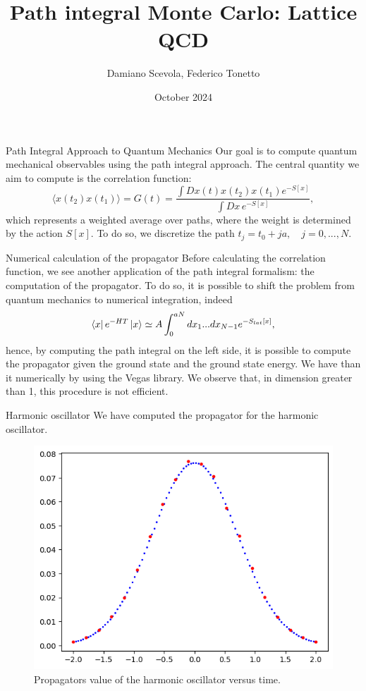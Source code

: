\documentclass{beamer}
\title{Path integral Monte Carlo: Lattice QCD}
\author{Damiano Scevola, Federico Tonetto}
\date{October 2024}
\begin{document}
\frame{\titlepage}

\begin{frame}{Path Integral Approach to Quantum Mechanics}
    Our goal is to compute quantum mechanical observables using the path integral approach. The central quantity we aim to compute is the correlation function:
    \begin{equation*}
        \langle x(t_2)x(t_1)\rangle = G(t) = \frac{\int Dx(t) x(t_2) x(t_1) e^{-S[x]}}{\int Dx \, e^{-S[x]}},
    \end{equation*}
    which represents a weighted average over paths, where the weight is determined by the action $S[x]$.
    To do so, we discretize the path $t_j = t_0 + ja, \quad j=0,...,N$.
\end{frame}

\begin{frame}{Numerical calculation of the propagator}
    Before calculating the correlation function, we see another application of the path integral formalism: the computation of the propagator.
    To do so, it is possible to shift the problem from quantum mechanics to numerical integration, indeed
    \begin{equation*}
        \bra{x}e^{-HT}\ket{x} \simeq A\int_0^{aN} dx_1...dx_{N-1} e^{-S_{lat} [x]},
    \end{equation*}
    hence, by computing the path integral on the left side, it is possible to compute the propagator given the ground state and the ground state energy. We have than it numerically by using the Vegas library.  We observe that, in dimension greater than 1, this procedure is not efficient.
\end{frame}

\begin{frame}{Harmonic oscillator}
    We have computed the propagator for the harmonic oscillator.
    \begin{figure}
        \centering
        \includegraphics[width=0.5\linewidth]{harmonic_oscillator_numerical_propagator.png}
        \caption{Propagators value of the harmonic oscillator versus time.}
        \label{fig:harmonic}
    \end{figure}
\end{frame}
\end{document}

